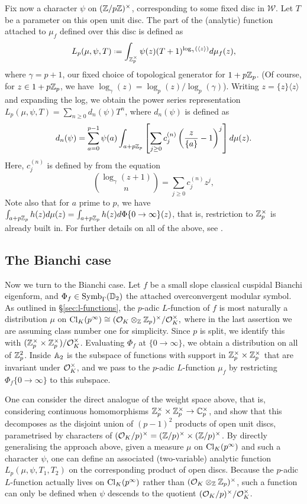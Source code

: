 \documentclass[a4paper,11pt]{article}
\newcommand{\W}{\mathcal{W}}
\numberwithin{equation}{section}
\begin{document}
Fix now a character $\psi$ on $(\mathbb{Z}/p\mathbb{Z})^\times$, corresponding to some fixed disc in $\W$. Let $T$ be a parameter on this open unit disc. The part of the (analytic) function attached to $\mu_f$ defined over this disc is defined as
\[
	L_p(\mu, \psi, T) \defeq \int_{\Zp^\times} \psi(z)(T+1)^{\log_{\gamma}(\langle z\rangle)} d\mu_f(z),
\]
 where $\gamma=p+1$, our fixed choice of topological generator for $1 + p\mathbb{Z}_p$. (Of course, for $z \in 1 + p\mathbb{Z}_p$, we have $\log_\gamma(z) = \log_p(z) / \log_p(\gamma)$). Writing $z = \{z\}\langle z\rangle$ and expanding the log, we obtain the power series representation $L_p(\mu,\psi,T) = \sum_{n\geq 0} d_n(\psi)T^n$, where $d_n(\psi)$ is defined as
\[
  d_n(\psi) =\sum_{a=0}^{p-1}\psi(a)  \int_{a+p\mathbb{Z}_p} \left[\sum_{j\geq 0} c_j^{(n)}\left(\frac{z}{\{a\}}-1\right)^j \right]d\mu(z).
\]
Here, $c_j^{(n)}$ is defined by from the equation
\begin{equation}\label{cjn}
  \binom{\log_{\gamma}(z+1)}{n} = \sum_{j\geq 0} c_j^{(n)} z^j,
\end{equation}
Note also that for $a$ prime to $p$, we have $\int_{a+p\mathbb{Z}_p}h(z) d\mu(z) = \int_{a+p\mathbb{Z}_p}h(z)d\Phi\{0\to\infty\}(z)$, that is, restriction to $\mathbb{Z}_p^\times$ is already built in. For further details on all of the above, see \cite[\S9]{PS11}.

\subsection{The Bianchi case}
Now we turn to the Bianchi case. Let $f$ be a small slope classical cuspidal Bianchi eigenform, and $\Phi_f \in \mathrm{Symb}_{\Gamma}(\mathbb{D}_2)$ the attached overconvergent modular symbol. As outlined in \S\ref{sec:l-functions}, the $p$-adic $L$-function of $f$ is most naturally a distribution $\mu$ on $\mathrm{Cl}_K(p^\infty) \cong (\mathcal{O}_K\otimes_{\mathbb{Z}}\mathbb{Z}_p)^\times/\mathcal{O}_K^\times,$ where in the last assertion we are assuming class number one for simplicity. Since $p$ is split, we identify this with $(\mathbb{Z}_p^\times \times \mathbb{Z}_p^\times)/\mathcal{O}_K^\times$. Evaluating $\Phi_f$ at $\{0\rightarrow\infty\}$, we obtain a distribution on all of $\mathbb{Z}_p^2$. Inside $\mathbb{A}_2$ is the subspace of functions with support in $\mathbb{Z}_p^\times \times \mathbb{Z}_p^\times$ that are invariant under $\mathcal{O}_K^\times$, and we pass to the $p$-adic $L$-function $\mu_f$ by restricting $\Phi_f\{0\to\infty\}$ to this subspace.

One can consider the direct analogue of the weight space above, that is, considering continuous homomorphisms $\mathbb{Z}_p^\times \times \mathbb{Z}_p^\times \rightarrow \mathbb{C}_p^\times$, and show that this decomposes as the disjoint union of $(p-1)^2$ products of open unit discs, parametrised by characters of $(\mathcal{O}_K/p)^\times = (\mathbb{Z}/p)^\times \times (\mathbb{Z}/p)^\times$. By directly generalising the approach above, given a measure $\mu$ on $\mathrm{Cl}_K(p^\infty)$ and such a character $\psi$, one can define an associated (two-variable) analytic function $L_p(\mu,\psi,T_1,T_2)$ on the corresponding product of open discs. Because the $p$-adic $L$-function actually lives on $\mathrm{Cl}_K(p^\infty)$ rather than $(\mathcal{O}_K\otimes_{\mathbb{Z}}\mathbb{Z}_p)^\times$, such a function can only be defined when $\psi$ descends to the quotient $(\mathcal{O}_K/p)^\times/\mathcal{O}_K^\times$.
\end{document}

